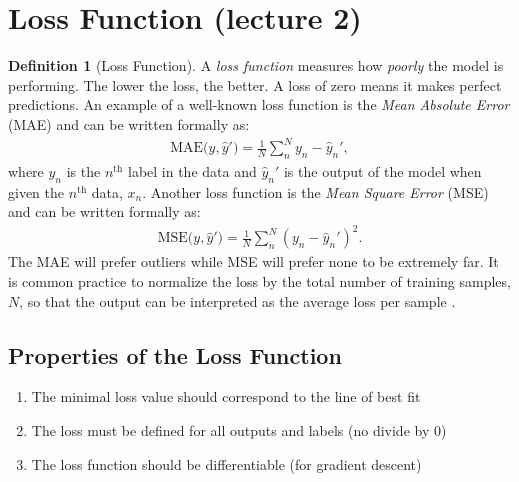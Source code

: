 \documentclass[11pt]{article}
\numberwithin{equation}{section}
\theoremstyle{definition}%
\newtheorem{definition}{Definition}[section]%
\begin{document}
\section{Loss Function (lecture 2)}
\begin{definition}[Loss Function]
A \emph{loss function} measures how \emph{poorly} the model is performing. The lower the loss, the better. A loss of zero means it makes perfect predictions. An example of a well-known loss function is the \emph{Mean Absolute Error} (MAE) and can be written formally as:
\begin{align}
    \text{MAE($y, \hat{y}'$)} = \frac{1}{N}\sum_{n}^{N}{y_n - \hat{y}_n'},
\end{align}
where $y_n$ is the $n^{\text{th}}$ label in the data and $\hat{y}_n'$ is the output of the model when given the $n^{\text{th}}$ data, $x_n$. Another loss function is the \emph{Mean Square Error} (MSE) and can be written formally as:
\begin{align}
    \text{MSE($y, \hat{y}'$)} = \frac{1}{N}\sum_{n}^{N}{(y_n - \hat{y}_n')^2}.
\end{align}
The MAE will prefer outliers while MSE will prefer none to be extremely far. It is common practice to normalize the loss by the total number of training samples, $N$, so that the output can be interpreted as the average loss per sample \cite{Cornell}.

\end{definition}

\subsection{Properties of the Loss Function}

\begin{enumerate}
    \item {The minimal loss value should correspond to the line of best fit}
    \item {The loss must be defined for all outputs and labels (no divide by 0)}
    \item {The loss function should be differentiable (for gradient descent)}
\end{enumerate}
\end{document}
